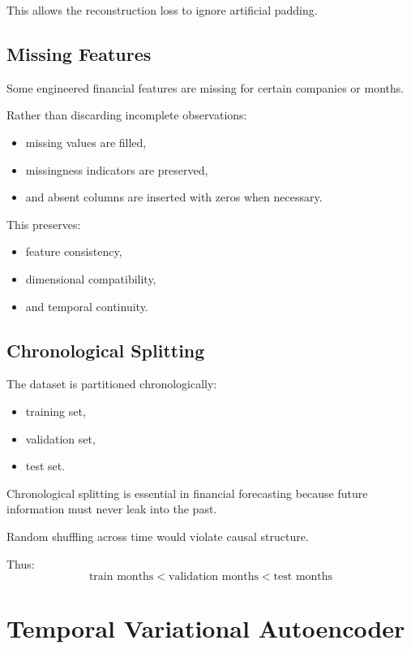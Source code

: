 \documentclass[11pt]{article}
\begin{document}
This allows the reconstruction loss to ignore artificial padding.

\subsection{Missing Features}

Some engineered financial features are missing for certain companies or months.

Rather than discarding incomplete observations:
\begin{itemize}
    \item missing values are filled,
    \item missingness indicators are preserved,
    \item and absent columns are inserted with zeros when necessary.
\end{itemize}

This preserves:
\begin{itemize}
    \item feature consistency,
    \item dimensional compatibility,
    \item and temporal continuity.
\end{itemize}

\subsection{Chronological Splitting}

The dataset is partitioned chronologically:
\begin{itemize}
    \item training set,
    \item validation set,
    \item test set.
\end{itemize}

Chronological splitting is essential in financial forecasting because future information must never leak into the past.

Random shuffling across time would violate causal structure.

Thus:
\[
\text{train months}
<
\text{validation months}
<
\text{test months}
\]

\section{Temporal Variational Autoencoder}
\end{document}
